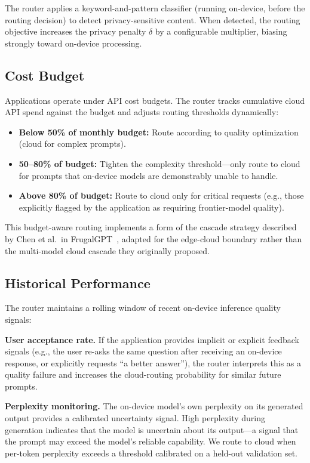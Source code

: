 \documentclass[12pt, letterpaper, twoside]{report}
\begin{document}
The router applies a keyword-and-pattern classifier (running on-device, before the routing decision) to detect privacy-sensitive content. When detected, the routing objective increases the privacy penalty $\delta$ by a configurable multiplier, biasing strongly toward on-device processing.

\subsection{Cost Budget}
\label{subsec:cost_budget}

Applications operate under API cost budgets. The router tracks cumulative cloud API spend against the budget and adjusts routing thresholds dynamically:

\begin{itemize}[itemsep=1pt, topsep=2pt, parsep=0pt]
\item \textbf{Below 50\% of monthly budget:} Route according to quality optimization (cloud for complex prompts).
\item \textbf{50--80\% of budget:} Tighten the complexity threshold---only route to cloud for prompts that on-device models are demonstrably unable to handle.
\item \textbf{Above 80\% of budget:} Route to cloud only for critical requests (e.g., those explicitly flagged by the application as requiring frontier-model quality).
\end{itemize}

This budget-aware routing implements a form of the cascade strategy described by Chen et al.\ in FrugalGPT~\cite{chen2023frugalgpt}, adapted for the edge-cloud boundary rather than the multi-model cloud cascade they originally proposed.

\subsection{Historical Performance}
\label{subsec:historical}

The router maintains a rolling window of recent on-device inference quality signals:

\textbf{User acceptance rate.} If the application provides implicit or explicit feedback signals (e.g., the user re-asks the same question after receiving an on-device response, or explicitly requests ``a better answer''), the router interprets this as a quality failure and increases the cloud-routing probability for similar future prompts.

\textbf{Perplexity monitoring.} The on-device model's own perplexity on its generated output provides a calibrated uncertainty signal. High perplexity during generation indicates that the model is uncertain about its output---a signal that the prompt may exceed the model's reliable capability. We route to cloud when per-token perplexity exceeds a threshold calibrated on a held-out validation set.
\end{document}
